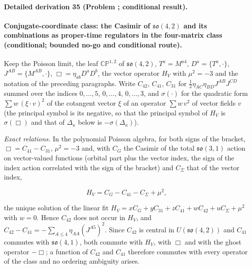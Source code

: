 \paragraph{Detailed derivation 35 (Problem ; conditional result).} \label{ref:detail-34} %



\paragraph{Conjugate-coordinate class: the Casimir of \(\mathfrak{so}(4,2)\) and its combinations as proper-time regulators in the four-matrix class (conditional; bounded no-go and conditional route).}

Keep the Poisson limit, the leaf \(\mathbb{CP}^{1,2}\) of \(\mathfrak{so}(4,2)\), \(T^a=M^{a4}\), \(D^a=\{T^a,\cdot\}\), \(J^{AB}=\{M^{AB},\cdot\}\), \(\Box=\eta_{ab}D^aD^b\), the vector operator \(H_V\) with \(\mu^2=-3\) and the notation of the preceding paragraphs. Write \(C_{42}\), \(C_{41}\), \(C_{31}\) for \(\tfrac12\eta_{AC}\eta_{BD}J^{AB}J^{CD}\) summed over the indices \(0,\dots,5\), \(0,\dots,4\), \(0,\dots,3\), and \(\sigma(\cdot)\) for the quadratic form \(\sum w\,(\xi\!\cdot\!v)^2\) of the cotangent vector \(\xi\) of an operator \(\sum w\,v^2\) of vector fields \(v\) (the principal symbol is its negative, so that the principal symbol of \(H_V\) is \(\sigma(\Box)\) and that of \(\Delta_\kappa\) below is \(-\sigma(\Delta_\kappa)\)).



\emph{Exact relations.} In the polynomial Poisson algebra, for both signs of the bracket, \(\Box=C_{41}-C_{31}\), \(\mu^2=-3\) and, with \(C_G\) the Casimir of the total \(\mathfrak{so}(3,1)\) action on vector-valued functions (orbital part plus the vector index, the sign of the index action correlated with the sign of the bracket) and \(C_\Sigma\) that of the vector index,

\[

H_V=C_G-C_{41}-C_\Sigma+\mu^2 ,

\]

the unique solution of the linear fit \(H_V=xC_G+yC_{31}+zC_{41}+wC_{42}+uC_\Sigma+\mu^2\) with \(w=0\). Hence \(C_{42}\) does not occur in \(H_V\), and \(C_{42}-C_{41}=-\sum_{A\le4}\eta_{AA}(J^{A5})^2\). Since \(C_{42}\) is central in \(U(\mathfrak{so}(4,2))\) and \(C_{41}\) commutes with \(\mathfrak{so}(4,1)\), both commute with \(H_V\), with \(\Box\) and with the ghost operator \(-\Box\); a function of \(C_{42}\) and \(C_{41}\) therefore commutes with every operator of the class and no ordering ambiguity arises.




